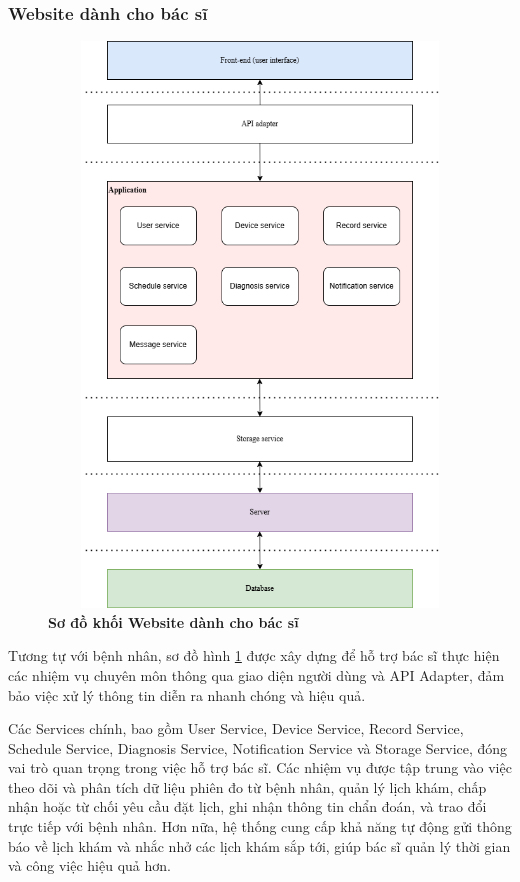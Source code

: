 \subsubsection{Website dành cho bác sĩ}
\begin{figure}[H]
	\centering
	\includegraphics[width=12cm,height=15cm]{Images/System/fmECG_architecture-Doctors.drawio.png}
	\caption[Sơ đồ khối Website dành cho bác sĩ]{\bfseries \fontsize{12pt}{0pt}\selectfont Sơ đồ khối Website dành cho bác sĩ}
	\label{fmECG_architecture-Doctor} %
\end{figure}

Tương tự với bệnh nhân, sơ đồ hình \ref{fmECG_architecture-Doctor} được xây dựng để hỗ trợ bác sĩ thực hiện các nhiệm vụ chuyên môn thông qua giao diện người dùng và API Adapter, đảm bảo việc xử lý thông tin diễn ra nhanh chóng và hiệu quả.

Các Services chính, bao gồm User Service, Device Service, Record Service, Schedule Service, Diagnosis Service, Notification Service và Storage Service, đóng vai trò quan trọng trong việc hỗ trợ bác sĩ.
Các nhiệm vụ được tập trung vào việc theo dõi và phân tích dữ liệu phiên đo từ bệnh nhân, quản lý lịch khám, chấp nhận hoặc từ chối yêu cầu đặt lịch, ghi nhận thông tin chẩn đoán, và trao đổi trực tiếp với bệnh nhân.
Hơn nữa, hệ thống cung cấp khả năng tự động gửi thông báo về lịch khám và nhắc nhở các lịch khám sắp tới, giúp bác sĩ quản lý thời gian và công việc hiệu quả hơn.

